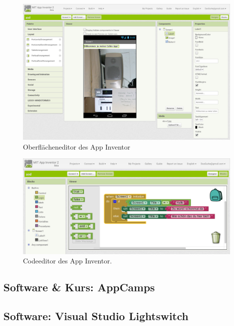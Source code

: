 \begin{figure}[p]
  \centering \includegraphics[width=\textwidth]{images/related-work-app-inventor-designer.png}
  \caption{Oberflächeneditor des App Inventor}
  \label{fig:app-inventor-ui-designer}
\end{figure}

\begin{figure}[p]
  \centering \includegraphics[width=\textwidth]{images/related-work-app-inventor-blocks.png}
  \caption{Codeeditor des App Inventor.}
  \label{fig:app-inventor-block-designer}
\end{figure}

\subsection{Software \& Kurs: AppCamps}



\subsection{Software: Visual Studio Lightswitch}

